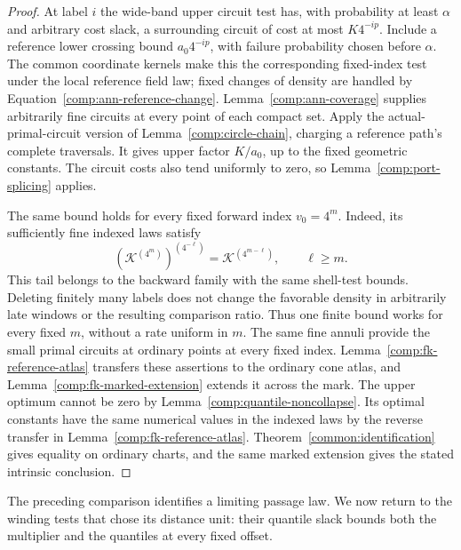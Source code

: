 \begin{proof}
At label $i$ the wide-band upper circuit test has, with probability
at least $\alpha$ and arbitrary cost slack, a surrounding circuit
of cost at most $K4^{-ip}$.  Include a reference lower crossing bound
$a_0 4^{-ip}$, with failure probability chosen before $\alpha$.
The common coordinate kernels make this the corresponding fixed-index
test under the local reference field law; fixed changes of density
are handled by Equation~\eqref{comp:ann-reference-change}.
Lemma~\ref{comp:ann-coverage} supplies arbitrarily fine circuits at
every point of each compact set.  Apply the actual-primal-circuit
version of Lemma~\ref{comp:circle-chain}, charging a reference path's
complete traversals.  It gives upper factor $K/a_0$, up to the fixed
geometric constants.  The circuit costs also tend uniformly to zero,
so Lemma~\ref{comp:port-splicing} applies.

The same bound holds for every fixed forward index $v_0=4^m$.
Indeed, its sufficiently fine indexed laws satisfy
\[
 (\mathcal K^{(4^m)})^{(4^{-\ell})}
       =\mathcal K^{(4^{m-\ell})},\qquad \ell\ge m.
\]
This tail belongs to the backward family with the same shell-test
bounds.  Deleting finitely many labels does not change the favorable
density in arbitrarily late windows or the resulting comparison
ratio.  Thus one finite bound works for every fixed $m$, without a
rate uniform in $m$.  The same fine annuli provide the small primal
circuits at ordinary points at every fixed index.
Lemma~\ref{comp:fk-reference-atlas} transfers these assertions
to the ordinary cone atlas, and Lemma~\ref{comp:fk-marked-extension}
extends it across the mark.  The upper optimum cannot be zero by
Lemma~\ref{comp:quantile-noncollapse}.  Its optimal constants have the
same numerical values in the indexed laws by the reverse transfer in
Lemma~\ref{comp:fk-reference-atlas}.  Theorem~\ref{common:identification}
gives equality on ordinary charts, and the same marked extension
gives the stated intrinsic conclusion.
\end{proof}


The preceding comparison identifies a limiting passage law.  We now
return to the winding tests that chose its distance unit: their quantile
slack bounds both the multiplier and the quantiles at every fixed offset.

